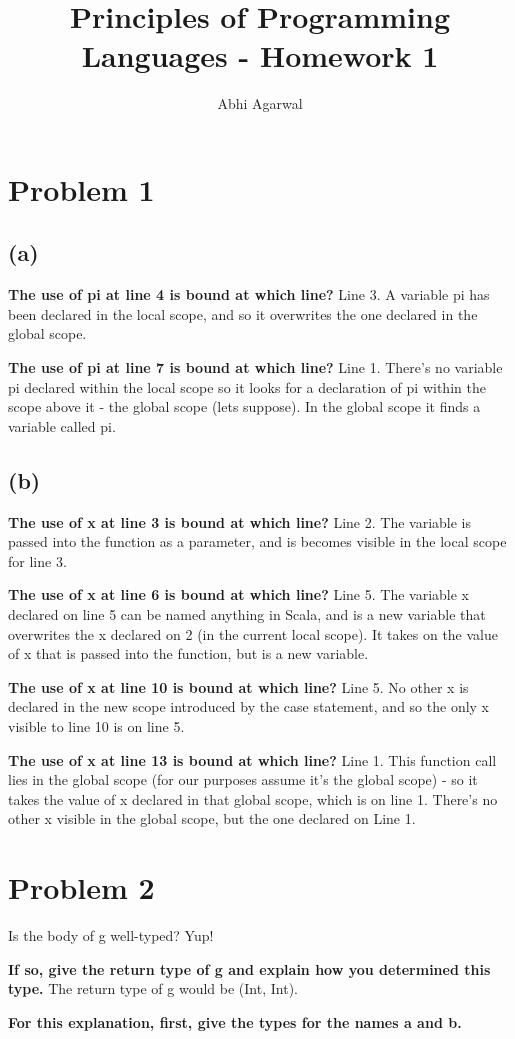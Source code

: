 \documentclass[11pt, oneside]{article}
\title{Principles of Programming Languages - Homework 1}
\author{Abhi Agarwal}
\date{}
\newcommand{\forceindent}{\leavevmode{\parindent=1.5em\indent}}
\begin{document}
\maketitle
\section{Problem 1}

\subsection*{(a)}
\forceindent \textbf{The use of pi at line 4 is bound at which line?} Line 3. A variable pi has been declared in the local scope, and so it overwrites the one declared in the global scope. 
\par \textbf{The use of pi at line 7 is bound at which line?} Line 1. There's no variable pi declared within the local scope so it looks for a declaration of pi within the scope above it - the global scope (lets suppose). In the global scope it finds a variable called pi.

\subsection*{(b)}
\forceindent \textbf{The use of x at line 3 is bound at which line?} Line 2. The variable is passed into the function as a parameter, and is becomes visible in the local scope for line 3.
\par \textbf{The use of x at line 6 is bound at which line?} Line 5. The variable x declared on line 5 can be named anything in Scala, and is a new variable that overwrites the x declared on 2 (in the current local scope). It takes on the value of x that is passed into the function, but is a new variable.
\par \textbf{The use of x at line 10 is bound at which line?} Line 5. No other x is declared in the new scope introduced by the case statement, and so the only x visible to line 10 is on line 5.
\par \textbf{The use of x at line 13 is bound at which line?} Line 1. This function call lies in the global scope (for our purposes assume it's the global scope) - so it takes the value of x declared in that global scope, which is on line 1. There's no other x visible in the global scope, but the one declared on Line 1.

\newpage

\section{Problem 2}
\forceindent Is the body of g well-typed? Yup!
\par \textbf{If so, give the return type of g and explain how you determined this type.} The return type of g would be (Int, Int).
\par \textbf{For this explanation, first, give the types for the names a and b.}
\end{document}
